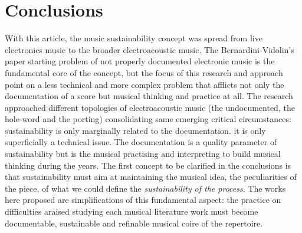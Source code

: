 \documentclass[twoside,a4paper]{article}
\begin{document}
%
%
%
%
%
%
%

\section{Conclusions}

With this article, the music sustainability concept was spread from live electronics music to the broader electroacoustic music. The Bernardini-Vidolin's paper\cite{bevi05} starting problem of not properly documented electronic music is the fundamental core of the concept, but the focus of this research and approach point on a less technical and more complex problem that afflicts not only the documentation of a score but musical thinking and practice at all. The research approached different topologies of electroacoustic music (the undocumented, the hole-word and the porting) consolidating same emerging critical circumstances: sustainability is only marginally related to the documentation. it is only superficially a technical issue. The documentation is a quality parameter of sustainability but is the musical practising and interpreting to build musical thinking during the years. The first concept to be clarified in the conclusions is that sustainability must aim at maintaining the musical idea, the peculiarities of the piece, of what we could define the \emph{sustainability of the process}. The works here proposed are simplifications of this fundamental aspect: the practice on difficulties araised studying each musical literature work must become documentable, sustainable and refinable musical coire of the repertoire.
\end{document}
